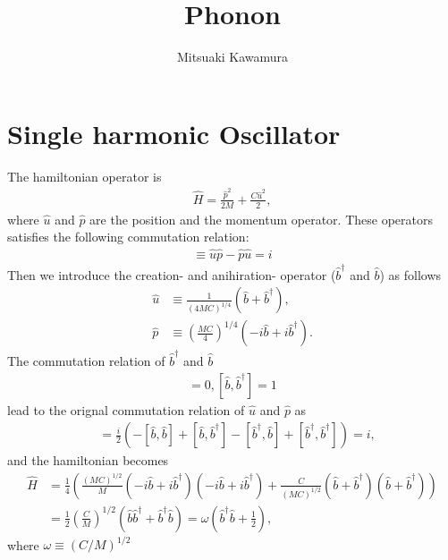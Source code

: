 \documentclass{article}
\begin{document}
\title{Phonon}
\author{Mitsuaki Kawamura}
\maketitle


\section{Single harmonic Oscillator}

The hamiltonian operator is
\begin{align}
    \hat{H} = \frac{\hat{p}^2}{2 M} + \frac{C \hat{u}^2}{2},
\end{align}
where $\hat{u}$ and $\hat{p}$ are the position and the momentum operator.
These operators satisfies the following commutation relation:
\begin{align}
    [\hat{u}, \hat{p}] \equiv \hat{u} \hat{p} - \hat{p} \hat{u} = i
\end{align}
Then we introduce the creation- and anihiration- operator ($\hat{b}^\dagger$ and $\hat{b}$)
as follows
\begin{align}
    \hat{u} &\equiv \frac{1}{(4 M C)^{1/4}}(\hat{b} + \hat{b}^\dagger),
    \\
    \hat{p} &\equiv \left(\frac{M C}{4}\right)^{1/4}(-i \hat{b} + i \hat{b}^\dagger).
\end{align}
The commutation relation of $\hat{b}^\dagger$ and $\hat{b}$
\begin{align}
    [\hat{b}, \hat{b}] = 0, [\hat{b}, \hat{b}^\dagger] = 1
\end{align}
lead to the orignal commutation relation of $\hat{u}$ and $\hat{p}$ as
\begin{align}
    [\hat{u}, \hat{p}] &= \frac{i}{2}(-[\hat{b}, \hat{b}] + [\hat{b}, \hat{b}^\dagger]
    -[\hat{b}^\dagger, \hat{b}] + [\hat{b}^\dagger, \hat{b}^\dagger])
    =i,
\end{align}
and the hamiltonian becomes
\begin{align}
    \hat{H} &= \frac{1}{4}\left( 
        \frac{(M C)^{1/2}}{M} (-i \hat{b} + i \hat{b}^\dagger)(-i \hat{b} + i \hat{b}^\dagger)
        + \frac{C}{(M C)^{1/2}}(\hat{b}+\hat{b}^\dagger)(\hat{b}+\hat{b}^\dagger)
        \right)
        \nonumber \\
    &=\frac{1}{2} \left(\frac{C}{M}\right)^{1/2} (\hat{b} \hat{b}^\dagger + \hat{b}^\dagger \hat{b})
    = \omega \left( \hat{b}^\dagger \hat{b} + \frac{1}{2}\right),
\end{align}
where $\omega\equiv(C/M)^{1/2}$
\end{document}
